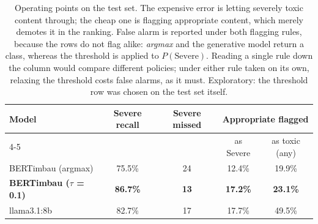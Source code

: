 \begin{table}[!t]
\centering
\caption{Operating points on the test set. The expensive error is letting severely toxic content through; the cheap one is flagging appropriate content, which merely demotes it in the ranking. False alarm is reported under both flagging rules, because the rows do not flag alike: \emph{argmax} and the generative model return a class, whereas the threshold is applied to $P(\text{Severe})$. Reading a single rule down the column would compare different policies; under either rule taken on its own, relaxing the threshold costs false alarms, as it must. Exploratory: the threshold row was chosen on the test set itself.}
\label{tab:pontos-operacao-teste}
\begin{tabular}{lcccc}
\toprule
Model & Severe recall & Severe missed & \multicolumn{2}{c}{Appropriate flagged} \\
\cmidrule(lr){4-5}
 & & & as Severe & as toxic (any)  \\
\midrule
BERTimbau (argmax) & 75.5\% & 24 & 12.4\% & 19.9\% \\
\textbf{BERTimbau ($\tau$ = 0.1)} & \textbf{86.7\%} & \textbf{13} & \textbf{17.2\%} & \textbf{23.1\%} \\
llama3.1:8b & 82.7\% & 17 & 17.7\% & 49.5\% \\
\bottomrule
\end{tabular}
\end{table}

